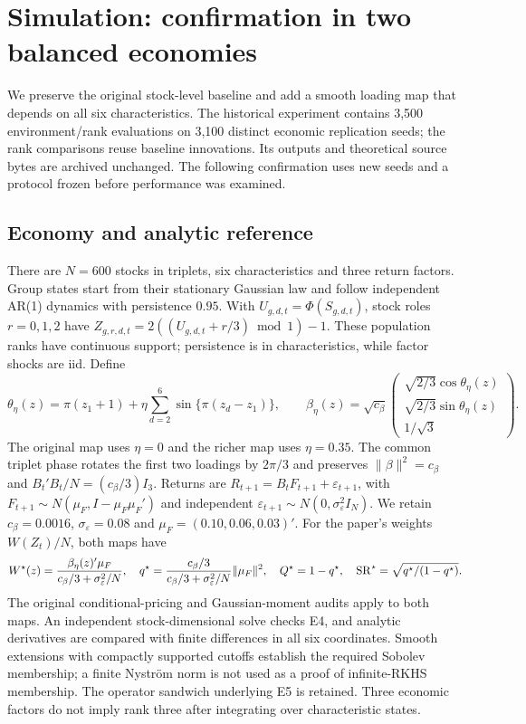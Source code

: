 
\section{Simulation: confirmation in two balanced economies}
\label{sec:balanced_simulation}
We preserve the original stock-level baseline and add a smooth loading map that
depends on all six characteristics. The historical experiment contains 3,500
environment/rank evaluations on 3,100 distinct economic replication seeds;
the rank comparisons reuse baseline innovations. Its outputs and theoretical
source bytes are archived unchanged. The following confirmation uses new seeds
and a protocol frozen before performance was examined.

\subsection{Economy and analytic reference}
There are $N=600$ stocks in triplets, six characteristics and three return
factors. Group states start from their stationary Gaussian law and follow
independent AR(1) dynamics with persistence $0.95$. With
$U_{g,d,t}=\Phi(S_{g,d,t})$, stock roles $r=0,1,2$ have
$Z_{g,r,d,t}=2((U_{g,d,t}+r/3)\bmod1)-1$. These population ranks have continuous
support; persistence is in characteristics, while factor shocks are iid.
Define
\[
\theta_\eta(z)=\pi(z_1+1)+\eta\sum_{d=2}^6\sin\{\pi(z_d-z_1)\},\qquad
\beta_\eta(z)=\sqrt{c_\beta}
\begin{pmatrix}\sqrt{2/3}\cos\theta_\eta(z)\\
\sqrt{2/3}\sin\theta_\eta(z)\\1/\sqrt3\end{pmatrix}.
\]
The original map uses $\eta=0$ and the richer map uses $\eta=0.35$.
The common triplet phase rotates the first two loadings by $2\pi/3$ and
preserves $\|\beta\|^2=c_\beta$ and $B_t'B_t/N=(c_\beta/3)I_3$.
Returns are $R_{t+1}=B_tF_{t+1}+\varepsilon_{t+1}$, with
$F_{t+1}\sim N(\mu_F,I-\mu_F\mu_F')$ and independent
$\varepsilon_{t+1}\sim N(0,\sigma_\varepsilon^2I_N)$.
We retain $c_\beta=0.0016$, $\sigma_\varepsilon=0.08$ and
$\mu_F=(0.10,0.06,0.03)'$. For the paper's weights $W(Z_t)/N$, both maps have
\[
W^\star(z)=\frac{\beta_\eta(z)'\mu_F}{c_\beta/3+\sigma_\varepsilon^2/N},\quad
q^\star=\frac{c_\beta/3}{c_\beta/3+\sigma_\varepsilon^2/N}\|\mu_F\|^2,
\quad Q^\star=1-q^\star,\quad \operatorname{SR}^\star=\sqrt{q^\star/(1-q^\star)}.
\]
The original conditional-pricing and Gaussian-moment audits apply to both
maps. An independent stock-dimensional solve checks E4, and analytic derivatives
are compared with finite differences in all six coordinates. Smooth extensions
with compactly supported cutoffs establish the required Sobolev membership;
a finite Nystr\"om norm is not used as a proof of infinite-RKHS membership.
The operator sandwich underlying E5 is retained. Three economic factors do
not imply rank three after integrating over characteristic states.

